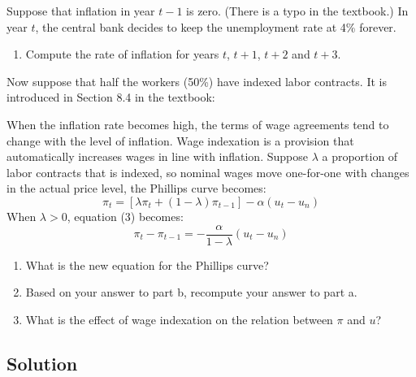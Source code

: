 \documentclass[12pt]{article}
\begin{document}
Suppose that inflation in year \(t-1\) is zero. (There is a typo in the textbook.) In year \(t\), the central bank decides to keep the unemployment rate at 4\% forever.
\begin{enumerate}[label=(\alph*)]
    \item Compute the rate of inflation for years \(t\), \(t+1\), \(t+2\) and \(t+3\).
\end{enumerate}

Now suppose that half the workers (50\%) have indexed labor contracts. It is introduced in Section 8.4 in the textbook:

When the inflation rate becomes high, the terms of wage agreements tend to change with the level of inflation. Wage indexation is a provision that automatically increases wages in line with inflation. Suppose \(\lambda\) a proportion of labor contracts that is indexed, so nominal wages move one-for-one with changes in the actual price level, the Phillips curve becomes:
\begin{equation}
\pi_t=\left[\lambda\pi_t+(1-\lambda)\pi_{t-1}\right]-\alpha(u_t-u_n) \tag{3}
\end{equation}
When \(\lambda>0\), equation (3) becomes:
\begin{equation}
\pi_t-\pi_{t-1}=-\frac{\alpha}{1-\lambda}(u_t-u_n) \tag{4}
\end{equation}

\begin{enumerate}[label=(\alph*),start=2]
    \item What is the new equation for the Phillips curve?
    \item Based on your answer to part b, recompute your answer to part a.
    \item What is the effect of wage indexation on the relation between \(\pi\) and \(u\)?
\end{enumerate}

\newpage
\subsection{Solution}
\end{document}
